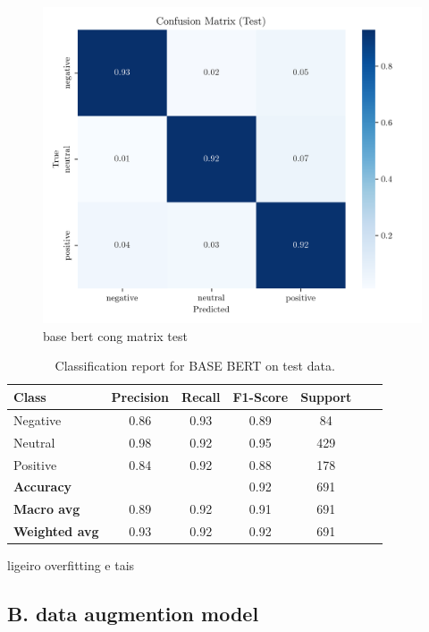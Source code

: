 \documentclass[conference]{IEEEtran}
\begin{document}
\begin{figure}[H]
    \centering
    \includegraphics[width=1\linewidth]{assets/base_bert_confusion_matrix_Test.png}
    \caption{base bert cong matrix test}
    \label{fig:base_bert_confusion_matrix_Test}
\end{figure}

\begin{table}[H]
\centering
\caption{Classification report for BASE BERT on test data.}
\label{cr_basebert_test}
\begin{tabular}{lcccccc}
\toprule
\textbf{Class} & \textbf{Precision} & \textbf{Recall} & \textbf{F1-Score} & \textbf{Support} \\
\midrule
Negative & 0.86 & 0.93 & 0.89 & 84 \\
Neutral & 0.98 & 0.92 & 0.95 & 429 \\
Positive & 0.84 & 0.92 & 0.88 & 178 \\
\midrule
\textbf{Accuracy} &  &  & 0.92 & 691 \\
\textbf{Macro avg} & 0.89 & 0.92 & 0.91 & 691 \\
\textbf{Weighted avg} & 0.93 & 0.92 & 0.92 & 691 \\
\bottomrule
\end{tabular}
\end{table}

ligeiro overfitting e tais

\subsection{B. data augmention model}
\end{document}
